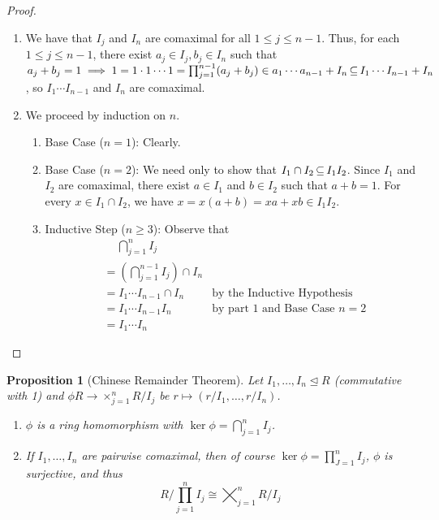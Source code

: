 \documentclass[11pt]{book}
\newcounter{counter}
\newtheorem{proposition}[counter]{Proposition}   \newtheorem{problem}[counter]{Problem}   \newtheorem*{proposition*}{Proposition}   \newtheorem*{lemma*}{Lemma}
\theoremstyle{definition}   \newtheorem{defn}[counter]{Definition} %
\newcommand{\nsg}{\mathrel{\unlhd}}   \newcommand{\ind}{\parindent24pt}   \newcommand{\vn}{\varnothing}
\DeclareMathOperator{\ra}{\rightarrow}   \DeclareMathOperator{\Poly}{\mathbf{P}}   \DeclareMathOperator{\spn}{\textnormal{span}}   \DeclareMathOperator{\aut}{\textnormal{Aut}}
\newcommand{\vs}{\vspace{8pt}}
\numberwithin{counter}{chapter}
\begin{document}
\begin{proof}
	\begin{enumerate}
		\item We have that $I_j$ and $I_n$ are comaximal for all $1 \leq j \leq n-1$. Thus, for each $1 \leq j \leq n-1$, there exist $a_j \in I_j, b_j \in I_n$ such that $a_j + b_j = 1 \implies 1 = 1 \cdot 1 \cdots 1 = \prod_{j=1}^{n-1} (a_j + b_j) \in a_1 \cdots a_{n-1} + I_n \operatorname{\subseteq} I_1 \cdots I_{n-1} + I_n$, so $I_1 \cdots I_{n-1}$ and $I_n$ are comaximal.

		\item We proceed by induction on $n$.
		\begin{enumerate}
			\item Base Case ($n = 1$): Clearly.

			\item Base Case ($n = 2$): We need only to show that $I_1 \cap I_2 \operatorname{\subseteq} I_1 I_2$. Since $I_1$ and $I_2$ are comaximal, there exist $a \in I_1$ and $b \in I_2$ such that $a+b = 1$. For every $x \in I_1 \cap I_2$, we have $x = x(a+b) = xa + xb \in I_1 I_2$.

			\item Inductive Step ($n \geq 3$): Observe that
			\begin{align*}
				&\quad\, \bigcap_{j=1}^n I_j \\
				&= \left(\bigcap_{j=1}^{n-1} I_j\right) \cap I_n \\
				&= I_1\cdots I_{n-1} \cap I_n &\text{by the Inductive Hypothesis} \\
				&= I_1\cdots I_{n-1}I_n &\text{by part 1 and Base Case $n=2$} \\
				&= I_1\cdots I_{n}
			\end{align*}
		\end{enumerate}
	\end{enumerate}
\end{proof}

\vs

\begin{proposition}[Chinese Remainder Theorem]
Let $I_1, \dots, I_n \nsg R$ (commutative with 1) and $\phi R \ra \times_{j=1}^n R/I_j$ be $r \mapsto (r/I_1, \dots, r/I_n)$.
\begin{enumerate}
\item[(a)] $\phi$ is a ring homomorphism with $\ker \phi = \bigcap_{j=1}^n I_j$.
\item[(b)] If $I_1,\dots,I_n$ are pairwise comaximal, then of course $\ker \phi = \prod_{J=1}^n I_j$, $\phi$ is surjective, and thus
	\[R / \prod_{j=1}^n I_j \cong \bigtimes_{j=1}^n R/I_j \]
\end{enumerate}
\end{proposition}
\end{document}

